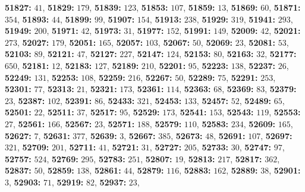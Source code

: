 \textsf{\bfseries 51827:} $41$, \textsf{\bfseries 51829:} $179$, \textsf{\bfseries 51839:} $123$, \textsf{\bfseries 51853:} $107$, \textsf{\bfseries 51859:} $13$, \textsf{\bfseries 51869:} $60$, \textsf{\bfseries 51871:} $354$, \textsf{\bfseries 51893:} $44$, \textsf{\bfseries 51899:} $99$, \textsf{\bfseries 51907:} $154$, \textsf{\bfseries 51913:} $238$, \textsf{\bfseries 51929:} $319$, \textsf{\bfseries 51941:} $293$, \textsf{\bfseries 51949:} $200$, \textsf{\bfseries 51971:} $42$, \textsf{\bfseries 51973:} $31$, \textsf{\bfseries 51977:} $152$, \textsf{\bfseries 51991:} $149$, \textsf{\bfseries 52009:} $42$, \textsf{\bfseries 52021:} $273$, \textsf{\bfseries 52027:} $179$, \textsf{\bfseries 52051:} $165$, \textsf{\bfseries 52057:} $103$, \textsf{\bfseries 52067:} $50$, \textsf{\bfseries 52069:} $23$, \textsf{\bfseries 52081:} $53$, \textsf{\bfseries 52103:} $89$, \textsf{\bfseries 52121:} $47$, \textsf{\bfseries 52127:} $227$, \textsf{\bfseries 52147:} $124$, \textsf{\bfseries 52153:} $80$, \textsf{\bfseries 52163:} $32$, \textsf{\bfseries 52177:} $650$, \textsf{\bfseries 52181:} $12$, \textsf{\bfseries 52183:} $127$, \textsf{\bfseries 52189:} $210$, \textsf{\bfseries 52201:} $95$, \textsf{\bfseries 52223:} $138$, \textsf{\bfseries 52237:} $26$, \textsf{\bfseries 52249:} $131$, \textsf{\bfseries 52253:} $108$, \textsf{\bfseries 52259:} $216$, \textsf{\bfseries 52267:} $50$, \textsf{\bfseries 52289:} $75$, \textsf{\bfseries 52291:} $253$, \textsf{\bfseries 52301:} $77$, \textsf{\bfseries 52313:} $21$, \textsf{\bfseries 52321:} $173$, \textsf{\bfseries 52361:} $114$, \textsf{\bfseries 52363:} $68$, \textsf{\bfseries 52369:} $83$, \textsf{\bfseries 52379:} $23$, \textsf{\bfseries 52387:} $102$, \textsf{\bfseries 52391:} $86$, \textsf{\bfseries 52433:} $321$, \textsf{\bfseries 52453:} $133$, \textsf{\bfseries 52457:} $52$, \textsf{\bfseries 52489:} $65$, \textsf{\bfseries 52501:} $22$, \textsf{\bfseries 52511:} $37$, \textsf{\bfseries 52517:} $95$, \textsf{\bfseries 52529:} $173$, \textsf{\bfseries 52541:} $153$, \textsf{\bfseries 52543:} $119$, \textsf{\bfseries 52553:} $27$, \textsf{\bfseries 52561:} $166$, \textsf{\bfseries 52567:} $23$, \textsf{\bfseries 52571:} $188$, \textsf{\bfseries 52579:} $110$, \textsf{\bfseries 52583:} $234$, \textsf{\bfseries 52609:} $165$, \textsf{\bfseries 52627:} $7$, \textsf{\bfseries 52631:} $377$, \textsf{\bfseries 52639:} $3$, \textsf{\bfseries 52667:} $385$, \textsf{\bfseries 52673:} $48$, \textsf{\bfseries 52691:} $107$, \textsf{\bfseries 52697:} $321$, \textsf{\bfseries 52709:} $201$, \textsf{\bfseries 52711:} $41$, \textsf{\bfseries 52721:} $31$, \textsf{\bfseries 52727:} $205$, \textsf{\bfseries 52733:} $30$, \textsf{\bfseries 52747:} $97$, \textsf{\bfseries 52757:} $524$, \textsf{\bfseries 52769:} $295$, \textsf{\bfseries 52783:} $251$, \textsf{\bfseries 52807:} $19$, \textsf{\bfseries 52813:} $217$, \textsf{\bfseries 52817:} $362$, \textsf{\bfseries 52837:} $50$, \textsf{\bfseries 52859:} $138$, \textsf{\bfseries 52861:} $44$, \textsf{\bfseries 52879:} $116$, \textsf{\bfseries 52883:} $162$, \textsf{\bfseries 52889:} $38$, \textsf{\bfseries 52901:} $3$, \textsf{\bfseries 52903:} $71$, \textsf{\bfseries 52919:} $82$, \textsf{\bfseries 52937:} $23$, 
